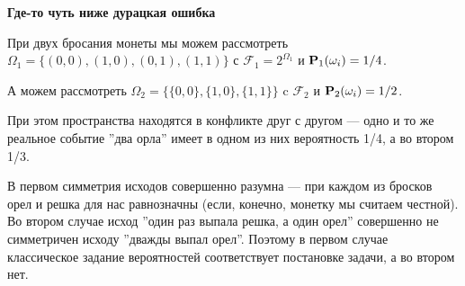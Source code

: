 \documentclass[11 pt,russian]{article}
\begin{document}
{\bf Где-то чуть ниже дурацкая ошибка}
\begin{Exam}
При двух бросания монеты мы можем рассмотреть $\Omega_1 = \{(0,0), (1,0), (0,1), (1,1)\}$ с $\mathcal{F}_1 = 2^{\Omega_1}$ и ${\bf P}_1(\omega_i) = 1/4$. 

А можем рассмотреть $\Omega_2 = \{\{0,0\}, \{1,0\}, \{1,1\}\}$ c $\mathcal{F}_2$ и ${\bf P}_2(\omega_i) = 1/2$. 

При этом пространства находятся в конфликте друг с другом --- одно и то же реальное событие ''два орла'' имеет в одном из них вероятность 1/4, а во втором 1/3. 

В первом симметрия исходов совершенно разумна --- при каждом из бросков орел и решка для нас равнозначны (если, конечно, монетку мы считаем честной). Во втором случае исход ''один раз выпала решка, а один орел'' совершенно не симметричен исходу ''дважды выпал орел''. Поэтому в первом случае классическое задание вероятностей соответствует постановке задачи, а во втором нет.
\end{Exam}
\end{document}
